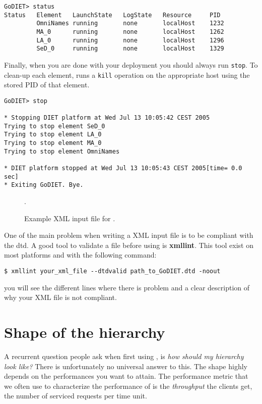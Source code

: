 \begin{verbatim}
GoDIET> status
Status   Element   LaunchState   LogState   Resource     PID
         OmniNames running       none       localHost    1232
         MA_0      running       none       localHost    1262
         LA_0      running       none       localHost    1296
         SeD_0     running       none       localHost    1329
\end{verbatim}

Finally, when you are done with your \diet deployment you should always run
\texttt{stop}. To clean-up each element, \godiet runs a \texttt{kill} operation
on the appropriate host using the stored PID of that element.

\begin{verbatim}
GoDIET> stop

* Stopping DIET platform at Wed Jul 13 10:05:42 CEST 2005
Trying to stop element SeD_0
Trying to stop element LA_0
Trying to stop element MA_0
Trying to stop element OmniNames

* DIET platform stopped at Wed Jul 13 10:05:43 CEST 2005[time= 0.0 sec]
* Exiting GoDIET. Bye.
\end{verbatim}

\begin{figure}[p]
.
\caption{Example XML input file for \godiet.\label{fig:godietXml}}
\end{figure}

One of the main problem when writing a \godiet XML input file is to be compliant
with the dtd. A good tool to validate a \godiet file before using \godiet is
\textbf{xmllint}. This tool exist on most platforms and with the following
command:
\begin{verbatim}
$ xmllint your_xml_file --dtdvalid path_to_GoDIET.dtd -noout
\end{verbatim}
you will see the different lines where there is problem and a clear description
of why your XML file is not compliant.

\clearpage

\section{Shape of the hierarchy}

A recurrent question people ask when first using \diet, is \emph{how should my
  hierarchy look like?} There is unfortunately no universal answer to
this. The shape highly depends on the performances you want \diet to
attain. The performance metric that we often use to characterize the
performance of \diet is the \emph{throughput} the clients get, \ie the number
of serviced requests per time unit. 

